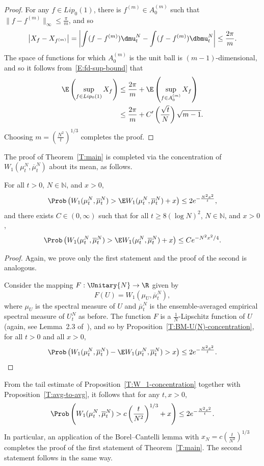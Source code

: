 \begin{proof}
For any $f\in Lip_0(1)$, there is $f^{(m)}\in A^{(m)}_0$ such that $\|f-f^{(m)}\|_\infty\le \frac{\pi}{m}$, and so
\[
\left|X_f-X_{f^{(m)}}\right|=\left|\int(f-f^{(m)})\dmu^N_t-\int(f-f^{(m)})\dbmu^N_t\right|\le\frac{2\pi}{m}.
\]
The space of functions for which $A^{(m)}_0$ is the unit ball is $(m-1)$-dimensional, and so it follows from~\eqref{E:fd-sup-bound} that
\begin{align*}
\E\left(\sup_{f\in Lip_0(1)}X_f\right) &\le \frac{2\pi}{m}+\E\left(\sup_{f\in A^{(m)}_0}X_f\right)\\
&\le\frac{2\pi}{m}+C'\left(\frac{\sqrt{t}}{N}\right)\sqrt{m-1}.
\end{align*}
Choosing $m=\left(\frac{N^2}{t}\right)^{1/3}$ completes the proof.
\end{proof}

The proof of Theorem~\ref{T:main} is completed via the concentration of $W_1(\mu^N_t,\overline{\mu}^N_t)$ about its mean, as follows.

\begin{prop}\label{T:W_1-concentration}
For all $t>0$, $N\in\mathbb{N}$, and $x>0$,
\[
\Prob\left(W_1(\mu^N_t,\overline{\mu}^N_t)>\E W_1(\mu^N_t,\overline{\mu}^N_t)+x\right)
\le 2e^{-\frac{N^2x^2}{t}},
\]
and there exists $C\in(0,\infty)$ such that for all $t\ge 8(\log N)^2$, $N\in\mathbb{N}$, and $x>0$,
\[
\Prob\left(W_1(\mu^N_t,\overline{\mu}^N_t)>\E W_1(\mu^N_t,\overline{\mu}^N_t)+x\right)
\le C e^{-N^2x^2/4}.
\]
\end{prop}

\begin{proof}
Again, we prove only the first statement and the proof of the second is analogous.

Consider the mapping $F:\Unitary{N}\to\R$ given by
\[
F(U)=W_1(\mu_U,\overline{\mu}^N_t),
\]
where $\mu_U$ is the spectral measure of $U$ and $\overline{\mu}^N_t$ is the ensemble-averaged empirical spectral measure of $U^N_t$ as before. The function $F$ is a $\frac{1}{N}$-Lipschitz function of $U$ (again, see Lemma~2.3 of~\cite{MM-PTRF-2013}), and so by Proposition~\ref{T:BM-U(N)-concentration}, for all $t>0$ and all $x>0$,
\[
\Prob\left(W_1(\mu^N_t,\overline{\mu}^N_t)-\E W_1(\mu^N_t,\overline{\mu}^N_t)>x\right)\le 2e^{-\frac{N^2x^2}{t}}.
\]
\end{proof}

From the tail estimate of Proposition~\ref{T:W_1-concentration} together with Proposition~\ref{T:avg-to-avg}, it follows that for any $t,x>0$,
\begin{equation}\label{E:dist-to-avg-tail-bound}
\Prob\left(W_1(\mu^N_t,\overline{\mu}^N_t)> c\left(\frac{t}{N^2}\right)^{1/3} + x\right)\le
2e^{-\frac{N^2x^2}{t}}.
\end{equation}
In particular, an application of the Borel--Cantelli lemma with $x_N=c\left(\frac{t}{N^2}\right)^{1/3}$ completes the proof of the first statement of Theorem~\ref{T:main}. The second statement follows in the same way.

